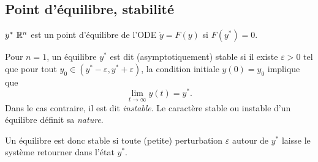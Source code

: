 \subsection{Point d'équilibre, stabilité} 

\begin{definition}
  $y^* \ \mathbb{R}^n$ est un point d'équilibre de l'ODE $\dot y = F(y)$ si $F(y^*) = 0$.
\end{definition}

\begin{definition}[Stabilité ($n = 1$)]
  Pour $n = 1$, un équilibre $y^*$ est dit (asymptotiquement) stable si il existe $\varepsilon > 0$ tel que pour tout $y_0 \in (y^* - \varepsilon, y^* + \varepsilon)$, la condition initiale $y(0) = y_0$ implique que 
  $$
  \lim_{t \rightarrow \infty} y(t) = y^*.
  $$
  Dans le cas contraire, il est dit {\em instable}. Le caractère stable ou instable d'un équilibre définit sa {\em nature}.
\end{definition}

\remark
Un équilibre est donc stable si toute (petite) perturbation $\varepsilon$ autour de $y^*$ laisse le système retourner dans l'état $y^*$.


